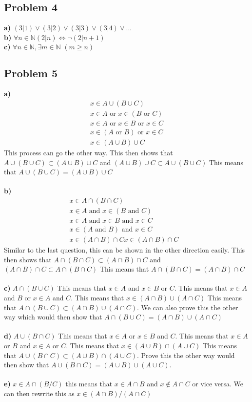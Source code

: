\documentclass[12pt]{article}
\newcommand{\N}{\mathbb{N}}
\begin{document}
\subsection*{Problem 4}
\textbf{a) } $(3|1) \lor (3|2) \lor (3|3) \lor (3|4) \lor  ...$ \\
\textbf{b) } $\forall n \in \N (2|n) \iff \lnot(2|n+1)$ \\
\textbf{c) } $\forall n \in \N, \exists m \in \N$ $(m \geq n)$
\subsection*{Problem 5}
\textbf{a)}
\begin{align*}
x \in A \cup (B \cup C) \\
x \in A \text{ or } x \in (B \text{ or } C) \\
x \in A \text{ or } x \in B \text{ or } x \in C \\
x \in (A \text{ or } B) \text{ or } x \in C \\
x \in (A \cup B) \cup C
\end{align*}
This process can go the other way. This then shows that $A \cup (B \cup C) \subset (A \cup B) \cup C$ and $(A \cup B) \cup C \subset A \cup (B \cup C)$ This means that $A \cup (B \cup C) = (A \cup B) \cup C$ \\\\
\textbf{b)}
\begin{align*}
x \in A \cap (B \cap C) & \\
x \in A \text{ and } x \in (B \text{ and } C) \\
x \in A \text{ and } x \in B \text{ and } x \in C \\
x \in (A \text{ and } B) \text{ and } x \in C \\
x \in (A \cap B) \cap C
x \in (A \cap B) \cap C
\end{align*}
Similar to the last question, this can be shown in the other direction easily. This then shows that $A \cap (B \cap C) \subset (A \cap B) \cap C$ and $(A \cap B) \cap C \subset A \cap (B \cap C)$ This means that $A \cap (B \cap C) = (A \cap B) \cap C$ \\\\
\textbf{c)} $A \cap (B \cup C)$ This means that $x \in A$ and $x \in B$ or $C$. This means that $x \in A$ and $B$ or $x \in A$ and $C$. This means that $x \in (A \cap B) \cup (A \cap C)$ This means that $A \cap (B \cup C) \subset (A \cap B) \cup (A \cap C)$. We can also prove this the other way which would then show that $A \cap (B \cup C) = (A \cap B) \cup (A \cap C)$\\\\
\textbf{d)} $A \cup (B \cap C)$ This means that $x \in A$ or $x \in B$ and $C$. This means that $x \in A$ or $B$ and $x \in A$ or $C$. This means that $x \in (A \cup B) \cap (A \cup C)$ This means that $A \cup (B \cap C) \subset (A \cup B) \cap (A \cup C)$. Prove this the other way would then show that $A \cup (B \cap C) = (A \cup B) \cup (A \cup C)$.\\\\
\textbf{e) } $x \in A \cap (B / C)$ this means that $x \in A \cap B$ and $x \not\in A \cap C$ or vice versa. We can then rewrite this as $x \in (A \cap B) / (A \cap C)$
\end{document}
